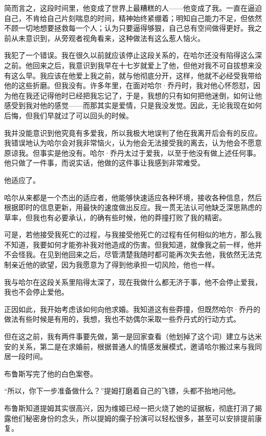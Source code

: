 \documentclass[../main]{subfiles}
\begin{document}
简而言之，这段时间里，他变成了世界上最糟糕的人——他变成了我。一直在逼迫自己，不肯给自己片刻喘息的时间，精神始终紧绷着；明知自己能力不足，但依然不顾一切地想要拯救每一个人；认为只要逼得够狠，自己总有空间做得更好。我之前从未意识到，从旁观者视角看来，这种做法有这么惹人恼火。

我犯了一个错误。我在很久以前就应该停止这段关系的，在哈尔还没有陷得这么深之前。他回来之后，我意识到我早在十七岁就爱上了他，但他对我不可自拔想来没有这么早。我应该在他爱上我之前，就与他彻底分开，这样，他就不必经受我带给他的这些折磨。但我没有。许多年里，在面对哈尔·乔丹时，我对他心怀怨怼，因为他在我还记得他时已经把我忘记了，于是，我想的只有如何把他迷倒，如何让他感受到我对他的感觉——而那其实是爱情，只是我没发觉。因此，无论我现在如何后悔，但我们早就过了可以回头的时候。

我并没能意识到他究竟有多爱我，所以我极大地误判了他在我离开后会有的反应。我错误地认为哈尔会对我非常恼火，认为他会无法接受我的离去，认为他会不愿意原谅我。但事实是他没有。哈尔·乔丹太过于爱我，以至于他没有做上述任何事。他只做了一件事，而说实话，他做的这件事让我感到非常难受。

他适应了。

哈尔从来都是一个杰出的适应者，他能够快速适应各种环境，接收各种信息，然后根据即时的信息更新，用最快的速度做出反应。我一贯无法认可他缺乏深思熟虑的草率，但我也有必要承认，的确有些时候，他的莽撞打败了我的精密。

可是，若他接受我死亡的过程，与我接受他死亡的过程有任何相似的地方，那么我不知道，我要如何才能弥补我对他造成的伤害。但我知道，就像我之前一样，他并不会怪我。在见到他回来之后，尽管清楚我随时都可能再次失去他，我依然无法克制亲近他的欲望，因为我愿意为了得到他承担一切风险，他也一样。

我与哈尔在这段关系里陷得太深了，现在我做什么都无济于事，他不会停止爱我，我也不会停止爱他。

正因如此，我开始考虑该如何向他求婚。我知道这有些莽撞，但既然哈尔·乔丹的做法有些时候是有用的，我想，我也不妨偶尔采取一些乔丹式的行动方式。

但在这之前，我有两件事要先做，第一是回家查看（他划掉了这个词）建立与达米安的关系，第二是在求婚前，根据普通人的情感发展模式，邀请哈尔搬过来与我同居一段时间。

布鲁斯写完了他的白色案卷。

“所以，你下一步准备做什么？”提姆打磨着自己的飞镖，头都不抬地问他。

布鲁斯知道提姆其实很高兴，因为维姬已经一把火烧了她的证据板，彻底打消了揭露他们秘密身份的念头，所以提姆的瘸子扮演可以轻松很多，甚至可以安排提前康复。
\end{document}
